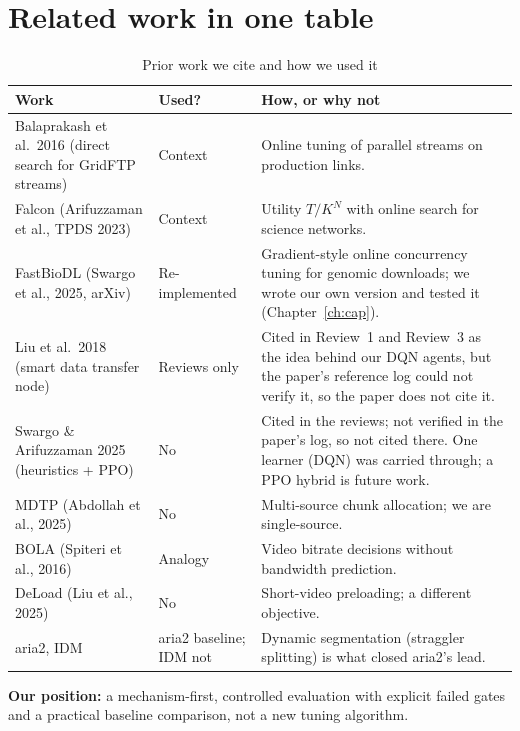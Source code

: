 \section{Related work in one table}
\begin{table}[H]\centering\small
\caption{Prior work we cite and how we used it}\label{tab:related}
\begin{tabularx}{\linewidth}{@{}P{4.0cm}P{2.1cm}L@{}}
\toprule
\textbf{Work} & \textbf{Used?} & \textbf{How, or why not}\\
\midrule
Balaprakash et al.\ 2016 (direct search for GridFTP streams) & Context & Online tuning of parallel streams on production links.\\
Falcon (Arifuzzaman et al., TPDS 2023) & Context & Utility $T/K^N$ with online search for science networks.\\
FastBioDL (Swargo et al., 2025, arXiv) & Re-implemented & Gradient-style online concurrency tuning for genomic downloads; we wrote our own version and tested it (Chapter~\ref{ch:cap}).\\
Liu et al.\ 2018 (smart data transfer node) & Reviews only & Cited in Review~1 and Review~3 as the idea behind our DQN agents, but the paper's reference log could not verify it, so the paper does not cite it.\\
Swargo \& Arifuzzaman 2025 (heuristics + PPO) & No & Cited in the reviews; not verified in the paper's log, so not cited there. One learner (DQN) was carried through; a PPO hybrid is future work.\\
MDTP (Abdollah et al., 2025) & No & Multi-source chunk allocation; we are single-source.\\
BOLA (Spiteri et al., 2016) & Analogy & Video bitrate decisions without bandwidth prediction.\\
DeLoad (Liu et al., 2025) & No & Short-video preloading; a different objective.\\
aria2, IDM & aria2 baseline; IDM not & Dynamic segmentation (straggler splitting) is what closed aria2's lead.\\
\bottomrule
\end{tabularx}
\end{table}
\textbf{Our position:} a mechanism-first, controlled evaluation with explicit failed gates and a practical baseline comparison, not a new tuning algorithm.
